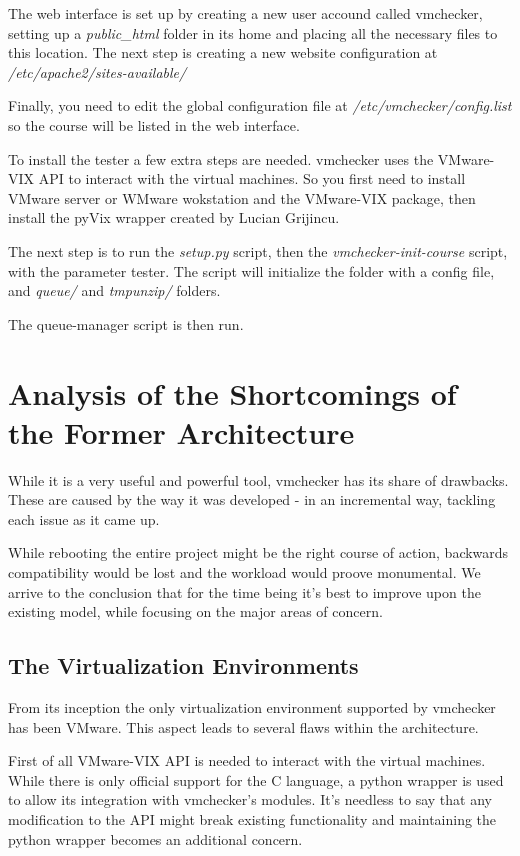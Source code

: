 The web interface is set up by creating a new user accound called vmchecker,
setting up a \textit{public_html} folder in its home and placing all the necessary files
to this location. The next step is creating a new website configuration at 
\textit{/etc/apache2/sites-available/}

Finally, you need to edit the global configuration file at \textit{/etc/vmchecker/config.list}
so the course will be listed in the web interface.

To install the tester a few extra steps are needed. vmchecker uses the VMware-VIX
API to interact with the virtual machines. So you first need to install VMware
server or WMware wokstation and the VMware-VIX package, then install the pyVix 
wrapper created by Lucian Grijincu.

The next step is to run the \textit{setup.py} script, then the \textit{vmchecker-init-course} script,
with the parameter tester. The script will initialize the folder with a config file,
and \textit{queue/} and \textit{tmpunzip/} folders.

The queue-manager script is then run. 


\section{Analysis of the Shortcomings of the Former Architecture}
\label{sec:vmc-analysis}

While it is a very useful and powerful tool, vmchecker has its share of drawbacks.
These are caused by the way it was developed - in an incremental way, tackling 
each issue as it came up. 

While rebooting the entire project might be the right course of action, 
backwards compatibility would be lost and the workload would 
proove monumental. We arrive to the conclusion that for the time being it's best
to improve upon the existing model, while focusing on the major areas of concern.

\subsection{The Virtualization Environments}
\label{sub-sec:vmc-analysis-env}

From its inception the only virtualization environment supported by vmchecker 
has been VMware. This aspect leads to several flaws within the architecture.

First of all VMware-VIX API is needed to interact with the virtual machines. 
While there is only official support for the C language, a python wrapper is
used to allow its integration with vmchecker's modules. It's needless to say
that any modification to the API might break existing functionality and 
maintaining the python wrapper becomes an additional concern.

